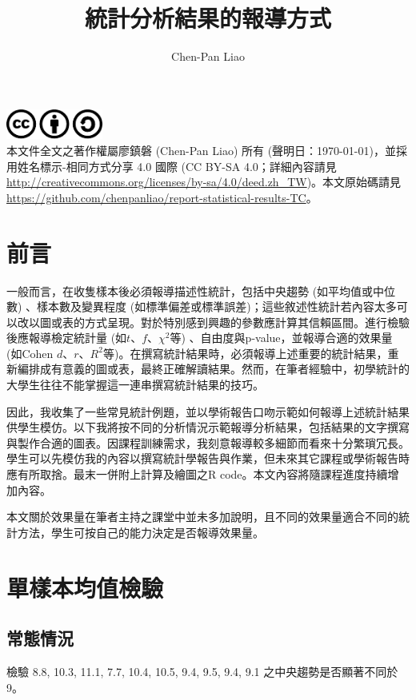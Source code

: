 \documentclass[12pt]{article}
\title{統計分析結果的報導方式}
\author{Chen-Pan Liao}
\begin{document}
\maketitle

{\centering\includegraphics[width=1.25in]{cc.pdf}\\[-0pt]}
\noindent 本文件全文之著作權屬廖鎮磐 (Chen-Pan Liao) 所有 (聲明日：\today)，並採用姓名標示-相同方式分享 4.0 國際 (CC BY-SA 4.0；詳細內容請見 \url{http://creativecommons.org/licenses/by-sa/4.0/deed.zh_TW})。本文原始碼請見 \url{https://github.com/chenpanliao/report-statistical-results-TC}。
\vspace{3ex}

\tableofcontents

\section{前言}
一般而言，在收隻樣本後必須報導描述性統計，包括中央趨勢 (如平均值或中位數) 、樣本數及變異程度 (如標準偏差或標準誤差)；這些敘述性統計若內容太多可以改以圖或表的方式呈現。對於特別感到興趣的參數應計算其信賴區間。進行檢驗後應報導檢定統計量 (如$t$、$f$、$\chi^2$等) 、自由度與p-value，並報導合適的效果量 (如Cohen $d$、$r$、$R^2$等)。在撰寫統計結果時，必須報導上述重要的統計結果，重新編排成有意義的圖或表，最終正確解讀結果。然而，在筆者經驗中，初學統計的大學生往往不能掌握這一連串撰寫統計結果的技巧。

因此，我收集了一些常見統計例題，並以學術報告口吻示範如何報導上述統計結果供學生模仿。以下我將按不同的分析情況示範報導分析結果，包括結果的文字撰寫與製作合適的圖表。因課程訓練需求，我刻意報導較多細節而看來十分繁瑣冗長。學生可以先模仿我的內容以撰寫統計學報告與作業，但未來其它課程或學術報告時應有所取捨。最末一併附上計算及繪圖之R code。本文內容將隨課程進度持續增加內容。

本文關於效果量在筆者主持之課堂中並未多加說明，且不同的效果量適合不同的統計方法，學生可按自己的能力決定是否報導效果量。


\section{單樣本均值檢驗}
\subsection{常態情況}
檢驗 8.8, 10.3, 11.1, 7.7, 10.4, 10.5, 9.4, 9.5, 9.4, 9.1 之中央趨勢是否顯著不同於9。
\end{document}
